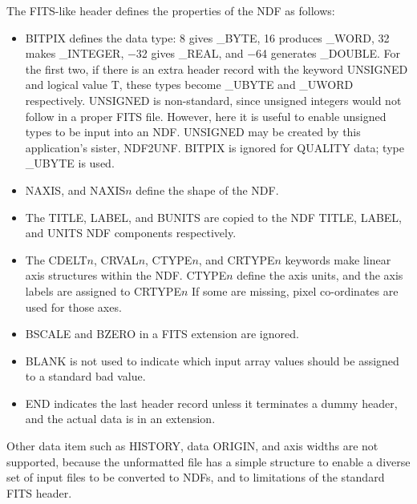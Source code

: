 {{{         \sstitem
            The FITS-like header defines the properties of the NDF as
            follows:
            \begin{itemize}
            \item BITPIX defines the data type: 8 gives \_BYTE, 16 produces
            \_WORD, 32 makes \_INTEGER, $-$32 gives \_REAL, and $-$64 generates
            \_DOUBLE.  For the first two, if there is an extra header
            record with the keyword UNSIGNED and logical value T, these
            types become \_UBYTE and \_UWORD respectively.  UNSIGNED is
            non-standard, since unsigned integers would not follow in a
            proper FITS file.  However, here it is useful to enable
            unsigned types to be input into an NDF.  UNSIGNED may be
            created by this application's sister, NDF2UNF.  BITPIX is
            ignored for QUALITY data; type \_UBYTE is used.
            \item NAXIS, and NAXIS$n$ define the shape of the NDF.
            \item The TITLE, LABEL, and BUNITS are copied to the NDF
            TITLE, LABEL, and UNITS NDF components respectively.
            \item The CDELT$n$, CRVAL$n$, CTYPE$n$, and CRTYPE$n$ keywords make
            linear axis structures within the NDF.  CTYPE$n$ define the
            axis units, and the axis labels are assigned to CRTYPE$n$ If
            some are missing, pixel co-ordinates are used for those
            axes.
            \item BSCALE and BZERO in a FITS extension are ignored.
            \item BLANK is not used to indicate which input array values
            should be assigned to a standard bad value.
            \item END indicates the last header record unless it
            terminates a dummy header, and the actual data is in an
            extension.
            \end{itemize}

         \sstitem
            Other data item such as HISTORY, data ORIGIN, and axis
            widths are not supported, because the unformatted file has a
            simple structure to enable a diverse set of input files to be
            converted to NDFs, and to limitations of the standard FITS
            header.
      }
   }
}

\newpage
\normalsize

